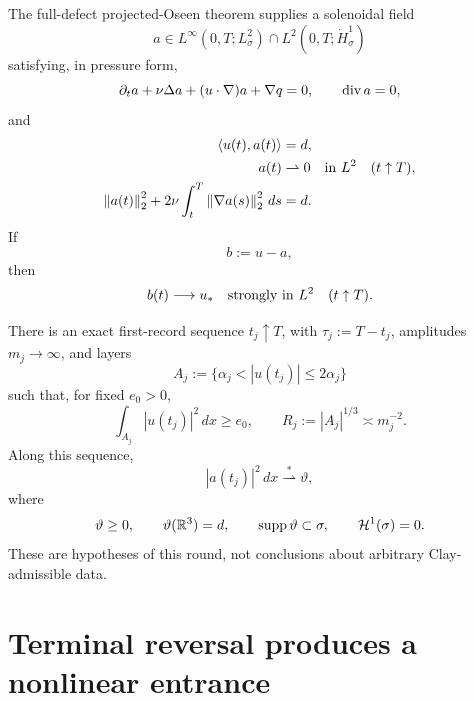\documentclass[11pt]{article}
\theoremstyle{remark}
\newcommand{\R}{\mathbb R}
\newcommand{\norm}[1]{\left\|#1\right\|}
\newcommand{\ip}[2]{\left\langle #1,#2\right\rangle}
\newcommand{\weakto}{\rightharpoonup}
\newcommand{\weakstarto}{\overset{*}{\rightharpoonup}}
\newcommand{\diver}{\mathop{\rm div}}
\newcommand{\supp}{\mathop{\rm supp}}
\begin{document}
The full-defect projected-Oseen theorem supplies a solenoidal field
\[
 a\in L^\infty(0,T;L^2_\sigma)
 \cap L^2(0,T;\dot H^1_\sigma)
\]
satisfying, in pressure form,
\begin{equation}
\label{eq:adjoint}
 \partial_ta+\nu\Delta a+(u\cdot\nabla)a+\nabla q=0,
 \qquad \diver a=0,
\end{equation}
and
\begin{align}
\label{eq:pair}
 \ip{u(t)}{a(t)}&=d,\\
\label{eq:aweak}
 a(t)&\weakto0\quad\hbox{in }L^2\quad(t\uparrow T),\\
\label{eq:aenergy}
 \norm{a(t)}_2^2+
 2\nu\int_t^T\norm{\nabla a(s)}_2^2\,ds&=d.
\end{align}
If
\begin{equation}
\label{eq:bdef}
 b:=u-a,
\end{equation}
then
\begin{equation}
\label{eq:bstrong}
 b(t)\longrightarrow u_*
 \quad\hbox{strongly in }L^2
 \quad(t\uparrow T).
\end{equation}

There is an exact first-record sequence \(t_j\uparrow T\), with
\(\tau_j:=T-t_j\), amplitudes \(m_j\to\infty\), and layers
\begin{equation}
\label{eq:layers}
 A_j:=\{\alpha_j<|u(t_j)|\leq2\alpha_j\}
\end{equation}
such that, for fixed \(e_0>0\),
\begin{equation}
\label{eq:layer-data}
 \int_{A_j}|u(t_j)|^2\,dx\geq e_0,\qquad
 R_j:=|A_j|^{1/3}\asymp m_j^{-2}.
\end{equation}
Along this sequence,
\begin{equation}
\label{eq:measure-input}
 |a(t_j)|^2\,dx\weakstarto\vartheta,
\end{equation}
where
\begin{equation}
\label{eq:theta}
 \vartheta\geq0,\qquad
 \vartheta(\R^3)=d,\qquad
 \supp\vartheta\subset\sigma,\qquad
 \mathcal H^1(\sigma)=0.
\end{equation}
These are hypotheses of this round, not conclusions about arbitrary
Clay-admissible data.

\section{Terminal reversal produces a nonlinear entrance}
\end{document}
